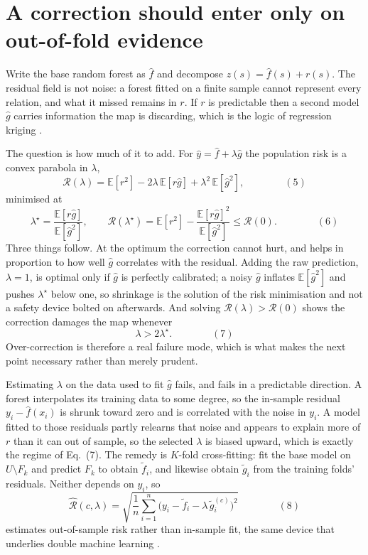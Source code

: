 \documentclass[preprint,12pt,authoryear]{elsarticle}
\newcommand{\eqnum}[1]{\qquad\qquad\mathrm{(#1)}}
\begin{document}
\section{A correction should enter only on out-of-fold evidence}
\label{sec:correction}

Write the base random forest \citep{breiman2001} as $\hat f$ and decompose
$z(s) = \hat f(s) + r(s)$. The residual field is not noise: a forest fitted on a
finite sample cannot represent every relation, and what it missed remains in
$r$. If $r$ is predictable then a second model $\hat g$ carries information the
map is discarding, which is the logic of regression kriging \citep{hengl2018}.

The question is how much of it to add. For $\hat y = \hat f + \lambda \hat g$
the population risk is a convex parabola in $\lambda$,
\[
\mathcal{R}(\lambda)
= \mathbb{E}[r^2] - 2\lambda\,\mathbb{E}[r\hat g] + \lambda^2\,\mathbb{E}[\hat g^2],
\eqnum{5}
\]
minimised at
\[
\lambda^\star = \frac{\mathbb{E}[r\hat g]}{\mathbb{E}[\hat g^2]},
\qquad
\mathcal{R}(\lambda^\star) = \mathbb{E}[r^2]
- \frac{\mathbb{E}[r\hat g]^2}{\mathbb{E}[\hat g^2]} \le \mathcal{R}(0).
\eqnum{6}
\]
Three things follow. At the optimum the correction cannot hurt, and helps in
proportion to how well $\hat g$ correlates with the residual. Adding the raw
prediction, $\lambda = 1$, is optimal only if $\hat g$ is perfectly calibrated;
a noisy $\hat g$ inflates $\mathbb{E}[\hat g^2]$ and pushes $\lambda^\star$
below one, so shrinkage is the solution of the risk minimisation and not a
safety device bolted on afterwards. And solving
$\mathcal{R}(\lambda) > \mathcal{R}(0)$ shows the correction damages the map
whenever
\[
\lambda > 2\lambda^\star .
\eqnum{7}
\]
Over-correction is therefore a real failure mode, which is what makes the next
point necessary rather than merely prudent.

Estimating $\lambda$ on the data used to fit $\hat g$ fails, and fails in a
predictable direction. A forest interpolates its training data to some degree,
so the in-sample residual $y_i - \hat f(x_i)$ is shrunk toward zero and is
correlated with the noise in $y_i$. A model fitted to those residuals partly
relearns that noise and appears to explain more of $r$ than it can out of
sample, so the selected $\lambda$ is biased upward, which is exactly the regime
of Eq.~(7). The remedy is $K$-fold cross-fitting: fit the base model on
$U \setminus F_k$ and predict $F_k$ to obtain $\tilde f_i$, and likewise obtain
$\tilde g_i$ from the training folds' residuals. Neither depends on $y_i$, so
\[
\widehat{\mathcal{R}}(c,\lambda)
= \sqrt{\frac{1}{n}\sum_{i=1}^{n}\big(y_i - \tilde f_i - \lambda\,\tilde g_i^{(c)}\big)^2}
\eqnum{8}
\]
estimates out-of-sample risk rather than in-sample fit, the same device that
underlies double machine learning \citep{chernozhukov2018}.
\end{document}
